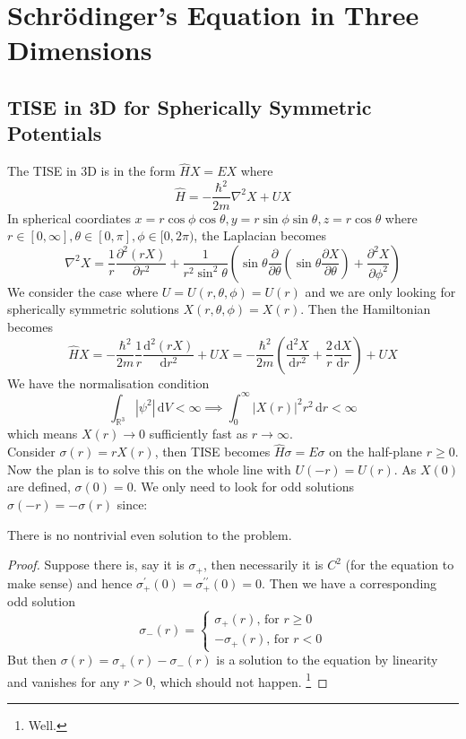 \section{Schr\"odinger's Equation in Three Dimensions}
\subsection{TISE in 3D for Spherically Symmetric Potentials}
The TISE in 3D is in the form $\hat{H}X=EX$ where
$$\hat{H}=-\frac{\hbar^2}{2m}\nabla^2X+UX$$
In spherical coordiates $x=r\cos\phi\cos\theta,y=r\sin\phi\sin\theta,z=r\cos\theta$ where $r\in[0,\infty],\theta\in[0,\pi],\phi\in[0,2\pi)$, the Laplacian becomes
$$\nabla^2X=\frac{1}{r}\frac{\partial^2(rX)}{\partial r^2}+\frac{1}{r^2\sin^2\theta}\left( \sin\theta\frac{\partial}{\partial\theta}\left( \sin\theta\frac{\partial X}{\partial\theta} \right)+\frac{\partial^2X}{\partial\phi^2} \right)$$
We consider the case where $U=U(r,\theta,\phi)=U(r)$ and we are only looking for spherically symmetric solutions $X(r,\theta,\phi)=X(r)$.
Then the Hamiltonian becomes
$$\hat{H}X=-\frac{\hbar^2}{2m}\frac{1}{r}\frac{\mathrm d^2(rX)}{\mathrm dr^2}+UX=-\frac{\hbar^2}{2m}\left( \frac{\mathrm d^2X}{\mathrm dr^2}+\frac{2}{r}\frac{\mathrm dX}{\mathrm dr} \right)+UX$$
We have the normalisation condition
$$\int_{\mathbb R^3}|\psi^2|\,\mathrm dV<\infty\implies \int_0^\infty|X(r)|^2r^2\,\mathrm dr<\infty$$
which means $X(r)\to 0$ sufficiently fast as $r\to\infty$.\\
Consider $\sigma(r)=rX(r)$, then TISE becomes $\hat{H}\sigma=E\sigma$ on the half-plane $r\ge 0$.
Now the plan is to solve this on the whole line with $U(-r)=U(r)$.
As $X(0)$ are defined, $\sigma(0)=0$.
We only need to look for odd solutions $\sigma(-r)=-\sigma(r)$ since:
\begin{lemma}
    There is no nontrivial even solution to the problem.
\end{lemma}
\begin{proof}
    Suppose there is, say it is $\sigma_+$, then necessarily it is $C^2$ (for the equation to make sense) and hence $\sigma_+^\prime(0)=\sigma_+^{\prime\prime}(0)=0$.
    Then we have a corresponding odd solution
    $$\sigma_-(r)=\begin{cases}
        \sigma_+(r)\text{, for $r\ge 0$}\\
        -\sigma_+(r)\text{, for $r<0$}
    \end{cases}$$
    But then $\sigma(r)=\sigma_+(r)-\sigma_-(r)$ is a solution to the equation by linearity and vanishes for any $r>0$, which should not happen.
    \footnote{Well.}
\end{proof}
